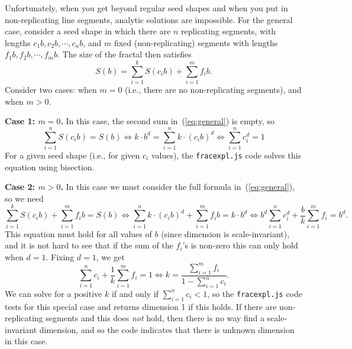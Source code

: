 \documentclass[11pt]{article}
\begin{document}
Unfortunately, when you get beyond regular seed shapes and when you
put in non-replicating line segments, analytic solutions are
impossible. For the general case, consider a seed shape
in which there are $n$ replicating segments, with lengths
$c_1b,c_2b,\cdots,c_nb$, and
$m$ fixed (non-replicating) segments with lengths
$f_1b,f_2b,\cdots,f_mb$. The size of the fractal then satisfies
\begin{equation}
\label{eq:general}
S(b) = \sum_{i=1}^k S(c_i b) + \sum_{i=1}^m f_i b .
\end{equation}
Consider two cases: when $m=0$ (i.e., there are no non-replicating
segments), and when $m>0$.

\par\vspace*{1.5ex}\noindent
\textbf{Case 1: $m=0$.}
In this case, the second sum in~(\ref{eq:general}) is empty, so
\[ \sum_{i=1}^n S(c_i b) = S(b)
   \iff k\cdot b^d = \sum_{i=1}^n k\cdot (c_i b)^d 
   \iff \sum_{i=1}^n c_i^d = 1
\]
For a given seed shape (i.e., for given $c_i$ values), the
\texttt{fracexpl.js} code solves this equation using 
bisection.

\par\vspace*{1.5ex}\noindent
\textbf{Case 2: $m>0$.} In this case we must consider the full formula
in~(\ref{eq:general}), so we need
\[ \sum_{i=1}^k S(c_i b) + \sum_{i=1}^m f_i b = S(b)
\iff
\sum_{i=1}^n k\cdot (c_i b)^d + \sum_{i=1}^m f_i b = k\cdot b^d
\iff
b^d \sum_{i=1}^n c_i^d + \frac{b}{k} \sum_{i=1}^m f_i = b^d
. \]
This equation must hold for all values of $b$ (since dimension is
scale-invariant), and it is not hard to
see that if the sum of the $f_i$'s is non-zero this can only hold when
$d=1$. Fixing $d=1$, we get
\[
\sum_{i=1}^n c_i + \frac{1}{k} \sum_{i=1}^m f_i = 1
\iff
k = \frac{\sum_{i=1}^m f_i}{1-\sum_{i=1}^n c_i} .
\]
We can solve for a positive $k$ if and only if $\sum_{i=1}^n c_i < 1$,
so the \texttt{fracexpl.js} code tests for this special case and
returns dimension 1 if this holds. If there are non-replicating
segments and this does \emph{not} hold, then there is no way find a
scale-invariant dimension, and so the code indicates that there is
unknown dimension in this case.
\end{document}
